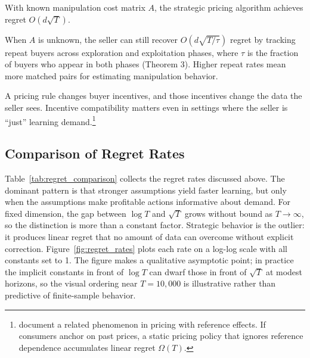\begin{theorem}
\label{thm:liu_fix}
With known manipulation cost matrix $A$, the strategic pricing algorithm achieves regret $O(d\sqrt{T})$.
\end{theorem}

When $A$ is unknown, the seller can still recover $O(d\sqrt{T/\tau})$ regret by tracking repeat buyers across exploration and exploitation phases, where $\tau$ is the fraction of buyers who appear in both phases (Theorem 3). Higher repeat rates mean more matched pairs for estimating manipulation behavior.

A pricing rule changes buyer incentives, and those incentives change the data the seller sees. Incentive compatibility matters even in settings where the seller is ``just'' learning demand.\footnote{\citet{Agrawal2024ref} document a related phenomenon in pricing with reference effects. If consumers anchor on past prices, a static pricing policy that ignores reference dependence accumulates linear regret $\Omega(T)$.}

\subsection{Comparison of Regret Rates}
\label{sec:comparison}

Table~\ref{tab:regret_comparison} collects the regret rates discussed above. The dominant pattern is that stronger assumptions yield faster learning, but only when the assumptions make profitable actions informative about demand. For fixed dimension, the gap between $\log T$ and $\sqrt{T}$ grows without bound as $T \to \infty$, so the distinction is more than a constant factor. Strategic behavior is the outlier: it produces linear regret that no amount of data can overcome without explicit correction. Figure~\ref{fig:regret_rates} plots each rate on a log-log scale with all constants set to 1. The figure makes a qualitative asymptotic point; in practice the implicit constants in front of $\log T$ can dwarf those in front of $\sqrt{T}$ at modest horizons, so the visual ordering near $T = 10{,}000$ is illustrative rather than predictive of finite-sample behavior.

